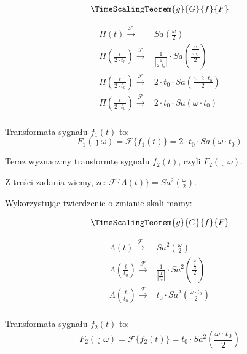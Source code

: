 \begin{task}
\begin{align*}
\TimeScalingTeorem{g}{G}{f}{F}
\end{align*}


\begin{align*}
\Pi(t) \xrightarrow{\mathcal F} & Sa\left(\frac{\omega}{2}\right)\\
\Pi(\frac{t}{2\cdot t_{0}}) \xrightarrow{\mathcal F} & \frac{1}{\left|\frac{1}{2 \cdot t_{0}}\right|} \cdot Sa\left(\frac{ \frac{\omega}{ \frac{1}{2\cdot t_{0}} }}{2}\right)\\
\Pi(\frac{t}{2\cdot t_{0}}) \xrightarrow{\mathcal F} & 2 \cdot t_{0} \cdot Sa\left(\frac{\omega \cdot 2 \cdot t_{0}}{2}\right)\\
\Pi(\frac{t}{2\cdot t_{0}}) \xrightarrow{\mathcal F} & 2 \cdot t_{0} \cdot Sa\left(\omega \cdot t_{0}\right)\\
\end{align*}

Transformata sygnału $f_{1}(t)$ to:
\begin{equation}
F_{1}(\jmath \omega) = \mathcal F\{f_{1}(t)\} = 2 \cdot t_{0} \cdot Sa\left(\omega \cdot t_{0}\right)
\end{equation}

Teraz wyznaczmy transformtę sygnału $f_{2}(t)$, czyli $F_{2}(\jmath \omega)$.

Z treści zadania wiemy, że:
$\mathcal F \{\Lambda(t)\} = Sa^2\left(\frac{\omega}{2}\right)$.

Wykorzystując twierdzenie o zmianie skali mamy:

\begin{align*}
\TimeScalingTeorem{g}{G}{f}{F}
\end{align*}

\begin{align*}
\Lambda(t) \xrightarrow{\mathcal F} & Sa^2\left(\frac{\omega}{2}\right)\\
\Lambda(\frac{t}{t_{0}}) \xrightarrow{\mathcal F} & \frac{1}{\left|\frac{1}{t_{0}}\right|} \cdot Sa^2\left(\frac{ \frac{\omega}{ \frac{1}{t_{0}} }}{2}\right)\\
\Lambda(\frac{t}{t_{0}}) \xrightarrow{\mathcal F} & t_{0} \cdot Sa^2\left(\frac{\omega \cdot t_{0}}{2}\right)\\
\end{align*}

Transformata sygnału $f_{2}(t)$ to:
\begin{equation}
F_{2}(\jmath \omega) = \mathcal F\{f_{2}(t)\} = t_{0} \cdot Sa^2\left(\frac{\omega \cdot t_{0}}{2}\right)
\end{equation}


\end{task}
